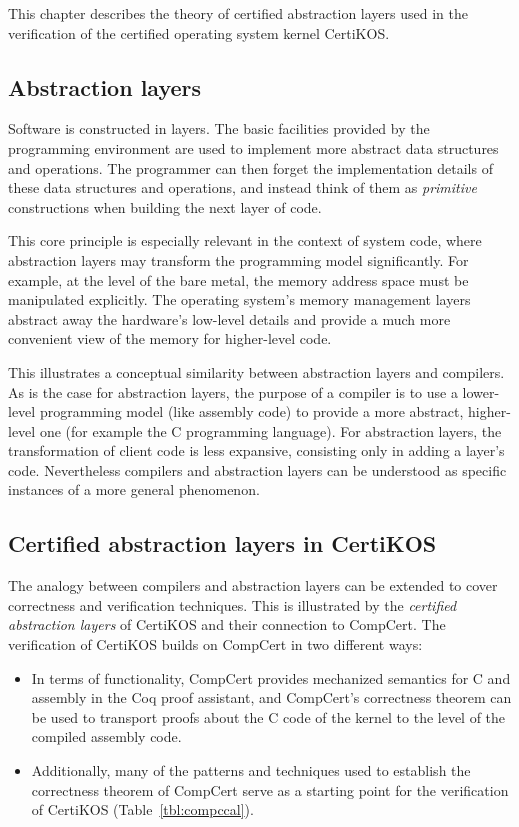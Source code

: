 \documentclass[11pt,oneside,draft]{book}
\theoremstyle{definition}
\begin{document}
This chapter describes
the theory of certified abstraction layers
used in the verification of
the certified operating system kernel CertiKOS.

\subsection{Abstraction layers} %

Software is constructed in layers.
The basic facilities provided by the programming environment
are used to implement more abstract data structures and operations.
The programmer can then forget the implementation details
of these data structures and operations,
and instead think of them as \emph{primitive} constructions
when building the next layer of code.

This core principle is especially relevant
in the context of system code,
where abstraction layers
may transform the programming model significantly.
For example,
at the level of the bare metal,
the memory address space must be manipulated explicitly.
The operating system's memory management layers
abstract away the hardware's low-level details and
provide a much more convenient view of the memory
for higher-level code.

This illustrates a conceptual similarity between
abstraction layers and compilers.
As is the case for abstraction layers,
the purpose of a compiler is to use a lower-level programming model
(like assembly code)
to provide a more abstract, higher-level one
(for example the C programming language).
For abstraction layers,
the transformation of client code
is less expansive,
consisting only in adding a layer's code.
Nevertheless compilers and abstraction layers
can be understood as specific instances
of a more general phenomenon.


\subsection{Certified abstraction layers in CertiKOS} %

The analogy between compilers and abstraction layers
can be extended to cover correctness and verification techniques.
This is illustrated by the \emph{certified abstraction layers}
of CertiKOS and their connection to CompCert.
The verification of CertiKOS builds on CompCert
in two different ways:
\begin{itemize}
\item
  In terms of functionality,
  CompCert provides mechanized semantics for C and assembly
  in the Coq proof assistant,
  and CompCert's correctness theorem
  can be used to transport proofs about the C code of the kernel
  to the level of the compiled assembly code.
\item
  Additionally,
  many of the patterns and techniques used
  to establish the correctness theorem of CompCert
  serve as a starting point for
  the verification of CertiKOS
  (Table~\ref{tbl:compccal}).
\end{itemize}
\end{document}
